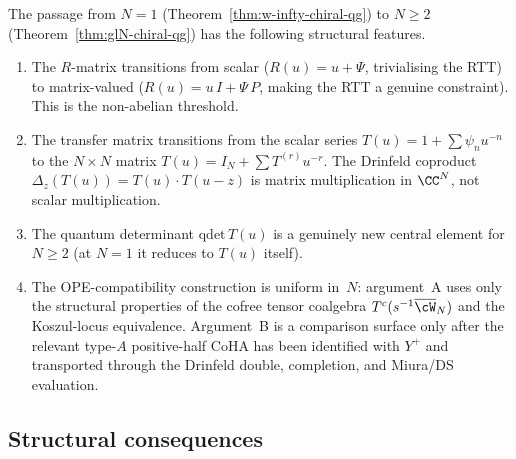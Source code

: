 \begin{remark}[The $N = 1 \to N \geq 2$ transition]
\label{rem:glN-transition}
The passage from $N = 1$
(Theorem~\ref{thm:w-infty-chiral-qg}) to $N \geq 2$
(Theorem~\ref{thm:glN-chiral-qg}) has the following
structural features.
\begin{enumerate}[label=\textup{(\arabic*)}]
\item The $R$-matrix transitions from scalar
 ($R(u) = u + \Psi$, trivialising the RTT) to
 matrix-valued ($R(u) = u\, I + \Psi\, P$, making
 the RTT a genuine constraint). This is the
 non-abelian threshold.
\item The transfer matrix transitions from the scalar
 series $T(u) = 1 + \sum \psi_n u^{-n}$ to the
 $N \times N$ matrix
 $T(u) = I_N + \sum T^{(r)} u^{-r}$.
 The Drinfeld coproduct
 $\Delta_z(T(u)) = T(u) \cdot T(u - z)$ is matrix
 multiplication in $\CC^N$, not scalar multiplication.
\item The quantum determinant $\mathrm{qdet}\, T(u)$ is a
 genuinely new central element for $N \geq 2$ (at
 $N = 1$ it reduces to $T(u)$ itself).
\item The OPE-compatibility construction is uniform in~$N$:
 argument~A uses only the structural properties
 of the cofree tensor coalgebra
 $T^c(s^{-1}\overline{\cW}_N)$ and the Koszul-locus
 equivalence. Argument~B is a comparison surface only after
 the relevant type-$A$ positive-half CoHA has been identified
 with $Y^+$ and transported through the Drinfeld double,
 completion, and Miura/DS evaluation.
\end{enumerate}
\end{remark}


\subsection{Structural consequences}
\label{subsec:structural-consequences}

